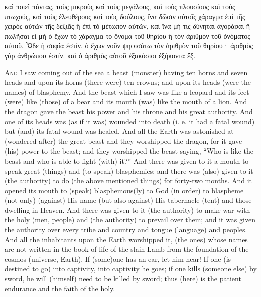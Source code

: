 \begin{pages}
\begin{Rightside}
		\pend
		\pstart
		καὶ ποιεῖ πάντας, τοὺς μικροὺς καὶ τοὺς μεγάλους, καὶ τοὺς πλουσίους καὶ τοὺς πτωχούς, καὶ τοὺς ἐλευθέρους καὶ τοὺς δούλους, ἵνα δῶσιν αὐτοῖς χάραγμα ἐπὶ τῆς χειρὸς αὐτῶν τῆς δεξιᾶς ἢ ἐπὶ τὸ μέτωπον αὐτῶν, καὶ ἵνα μή τις δύνηται ἀγοράσαι ἢ πωλῆσαι εἰ μὴ ὁ ἔχων τὸ χάραγμα τὸ ὄνομα τοῦ θηρίου ἢ τὸν ἀριθμὸν τοῦ ὀνόματος αὐτοῦ. Ὧδε ἡ σοφία ἐστίν. ὁ ἔχων νοῦν ψηφισάτω τὸν ἀριθμὸν τοῦ θηρίου· ἀριθμὸς γὰρ ἀνθρώπου ἐστίν. καὶ ὁ ἀριθμὸς αὐτοῦ ἑξακόσιοι ἑξήκοντα ἕξ.
		\pend
        \endnumbering
    \end{Rightside}
    \begin{Leftside}
        \beginnumbering
		\renewcommand{\LettrineFontHook}{\Zallmanfamily}
		\lettrine[lines=3]{A}{nd} I saw coming out of the sea a beast (monster) having ten horns and seven heads and upon its horns (there were) ten crowns; and upon its heads (were the names) of blasphemy. And the beast which I saw was like a leopard and its feet (were) like (those) of a bear and its mouth (was) like the mouth of a lion. And the dragon gave the beast his power and his throne and his great authority. 
		\pend
		\pstart
		And one of its heads was (as if it was) wounded into death (i. e. it had a fatal wound) but (and) its fatal wound was healed. And all the Earth was astonished at (wondered after) the great beast and they worshipped the dragon, for it gave (his) power to the beast; and they worshipped the beast saying, “Who is like the beast and who is able to fight (with) it?” 
		\pend
		\pstart
		And there was given to it a mouth to speak great (things) and (to speak) blasphemies; and there was (also) given to it (the authority) to do (the above mentioned things) for forty-two months. And it opened its mouth to (speak) blasphemous(ly) to God (in order) to blaspheme (not only) (against) His name (but also against) His tabernacle (tent) and those dwelling in Heaven. 
		\pend
		\pstart
		And there was given to it (the authority) to make war with the holy (men, people) and (the authority) to prevail over them; and it was given the authority over every tribe and country and tongue (language) and peoples. And all the inhabitants upon the Earth worshipped it, (the ones) whose names are not written in the book of life of the slain Lamb from the foundation of the cosmos (universe, Earth). If (some)one has an ear, let him hear! If one (is destined to go) into captivity, into captivity he goes; if one kills (someone else) by sword, he will (himself) need to be killed by sword; thus (here) is the patient endurance and the faith of the holy. 

\end{Leftside}
\end{pages}
